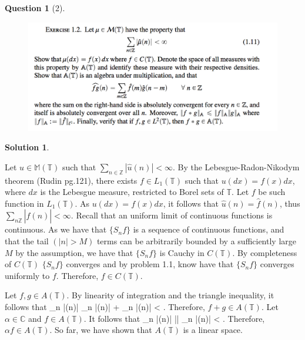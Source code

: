 \documentclass{article} %
\def\eQb#1\eQe{\begin{eqnarray*}#1\end{eqnarray*}}
\theoremstyle{quest}
\newtheorem*{question}{Question}
\newtheorem*{solution}{Solution}
\begin{document}
\begin{question}[2]
\hfill
\begin{figure}[h!]
  \centering
    \includegraphics[width=1\textwidth]{HA-1-2.png}
\end{figure}
\end{question}
\begin{solution}

\end{solution}
Let $u \in \mathbb{M}(\mathbb{T})$ 
such that $\sum_{n \in \mathbb{Z}} |\hat{u}(n)| < \infty$. By the Lebesgue-Radon-Nikodym
theorem (Rudin pg.121), there exists $f \in L_1(\mathbb{T})$ such that $u(dx) = f(x)dx$,
where $dx$ is the Lebesgue measure, restricted to Borel sets of $\mathbb{T}$. Let $f$ be
such function in $L_1(\mathbb{T})$. As 
$u(dx) = f(x)dx$, it follows that $\hat{u}(n) = \hat{f}(n)$, thus $\sum_{n \mathbb{Z}} 
|\hat{f}(n)| < \infty$. Recall that an uniform limit of continuous functions is continuous.
As we have that $\{S_n f\}$ is a sequence of continuous functions, and that the tail
$(|n| > M)$ terms can be arbitrarily bounded by a sufficiently large $M$ by the assumption,
we have that $\{S_n f \}$ is Cauchy in $C(\mathbb{T})$. By completeness of $C(\mathbb{T})$ 
$\{S_n f\}$ converges and by problem 1.1, know have that $\{S_n f \}$ converges uniformly to
$f$. Therefore, $f \in C(\mathbb{T})$.

\smallskip

Let $f,g \in A(\mathbb{T})$. By linearity of integration and the triangle inequality, it follows that
\eQb
\sum_{n \in {}} |(n)| \leq \sum_{n \in {}} |(n)|
+ \sum_{n \in {}} |(n)| < \infty.
\eQe
Therefore, $f+g \in A(\mathbb{T})$. Let $\alpha \in \mathbb{C}$ and $f \in A(\mathbb{T})$. It follows
that
\eQb
\sum_{n \in {}} |\alpha {}(n)| \leq |\alpha| 
\sum_{n \in {}} |(n)| < \infty.
\eQe
Therefore, $\alpha f \in A(\mathbb{T})$. So far, we have shown that $A(\mathbb{T})$ is a linear space.
\end{document}
